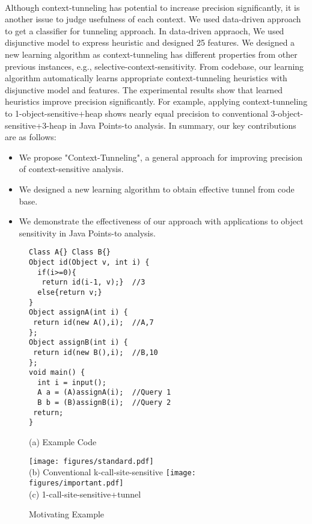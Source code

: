 {\\
Although context-tunneling has potential to increase precision significantly, it is another issue to judge usefulness of each context. We used data-driven approach to get a classifier for tunneling approach. In data-driven appraoch, We used disjunctive model to express heuristic and designed 25 features. We designed a new learning algorithm as context-tunneling has different properties from other previous instances, e.g., selective-context-sensitivity. From codebase, our learning algorithm automatically learns appropriate context-tunneling heuristics with disjunctive model and features. The experimental results show that learned heuristics improve precision significantly. For example, applying context-tunneling to 1-object-sensitive+heap shows nearly equal precision to conventional 3-object-sensitive+3-heap in Java Points-to analysis. In summary, our key contributions are as follows:
\begin{itemize}
\item{We propose "Context-Tunneling", a general approach for improving precision of context-sensitive analysis.}
\item{We designed a new learning algorithm to obtain effective tunnel from code base.}
\item{We demonstrate the effectiveness of our approach with applications to object sensitivity in Java Points-to analysis.}
\end{itemize}

\begin{figure}
\begin{multicols}{2}
\begin{lstlisting}
Class A{} Class B{}
Object id(Object v, int i) {
  if(i>=0){
   return id(i-1, v);}  //3
  else{return v;}
}
Object assignA(int i) {
 return id(new A(),i);  //A,7
};
Object assignB(int i) {
 return id(new B(),i);  //B,10
};
void main() {
  int i = input();
  A a = (A)assignA(i);  //Query 1
  B b = (B)assignB(i);  //Query 2
 return;
}
\end{lstlisting}
(a) Example Code\\
\begin{center}
\texttt{[image: figures/standard.pdf]}\\
(b) Conventional k-call-site-sensitive
\texttt{[image: figures/important.pdf]}\\
(c) 1-call-site-sensitive+tunnel
\end{center}
\end{multicols}
\caption{Motivating Example}
\label{fig:ExampleCode}
\end{figure}
}

